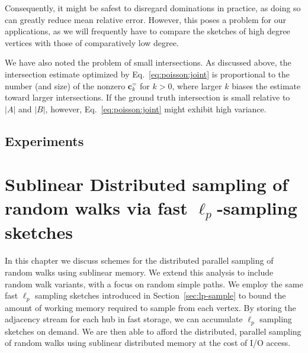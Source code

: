 \documentclass{report}
\begin{document}
Consequently, it might be safest to disregard dominations in practice, as doing so can greatly reduce mean relative error.
However, this poses a problem for our applications, as we will frequently have to compare the sketches of high degree vertices with those of comparatively low degree. 

We have also noted the problem of small intersections. 
As discussed above, the intersection estimate optimized by Eq.~\eqref{eq:poisson:joint} is proportional to the number (and size) of the nonzero $\mathbf{c}^{=}_k$ for $k>0$, where larger $k$ biases the estimate toward larger intersections. 
If the ground truth intersection is small relative to $|A|$ and $|B|$, however, Eq.~\eqref{eq:poisson:joint} might exhibit high variance.




\section{Experiments}
 \label{DS:sec:experiments}















\chapter{Sublinear Distributed sampling of random walks via fast $\ell_p$-sampling sketches}
 \label{chap:walks}

In this chapter we discuss schemes for the distributed parallel sampling of random walks using sublinear memory.
We extend this analysis to include random walk variants, with a focus on random simple paths.
We employ the same fast $\ell_p$ sampling sketches introduced in Section~\ref{sec:lp-sample} to bound the amount of working memory required to  sample from each vertex. 
By storing the adjacency stream for each hub in fast storage, we can accumulate $\ell_p$ sampling sketches on demand.
We are then able to afford the distributed, parallel sampling of random walks using sublinear distributed memory at the cost of I/O access. 
\end{document}

